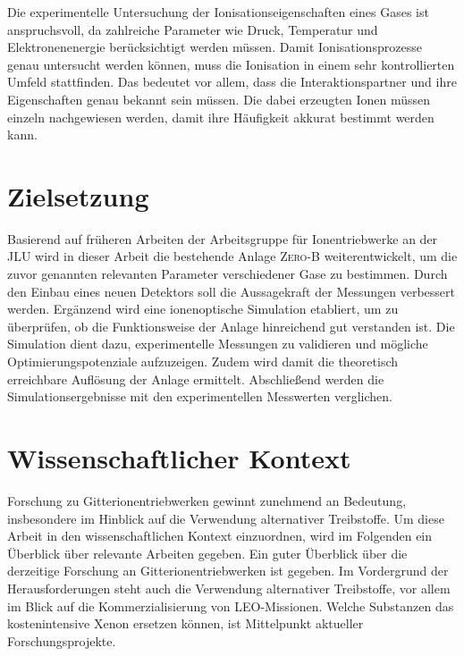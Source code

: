 Die experimentelle Untersuchung der Ionisationseigenschaften eines Gases ist anspruchsvoll, da zahlreiche Parameter wie Druck, Temperatur und Elektronenenergie berücksichtigt werden müssen. Damit Ionisationsprozesse genau untersucht werden können, muss die Ionisation in einem sehr kontrollierten Umfeld stattfinden. Das bedeutet vor allem, dass die Interaktionspartner und ihre Eigenschaften genau bekannt sein müssen. Die dabei erzeugten Ionen müssen einzeln nachgewiesen werden, damit ihre Häufigkeit akkurat bestimmt werden kann. 

\section{Zielsetzung}
Basierend auf früheren Arbeiten der Arbeitsgruppe für Ionentriebwerke an der JLU wird in dieser Arbeit die bestehende Anlage \textsc{Zero-B} weiterentwickelt, um die zuvor genannten relevanten Parameter verschiedener Gase zu bestimmen. Durch den Einbau eines neuen Detektors soll die Aussagekraft der Messungen verbessert werden. Ergänzend wird eine ionenoptische Simulation etabliert, um zu überprüfen, ob die Funktionsweise der Anlage hinreichend gut verstanden ist. Die Simulation dient dazu, experimentelle Messungen zu validieren und mögliche Optimierungspotenziale aufzuzeigen. Zudem wird damit die theoretisch erreichbare Auflösung der Anlage ermittelt. Abschließend werden die Simulationsergebnisse mit den experimentellen Messwerten verglichen.

\section{Wissenschaftlicher Kontext}
Forschung zu Gitterionentriebwerken gewinnt zunehmend an Bedeutung, insbesondere im Hinblick auf die Verwendung alternativer Treibstoffe. Um diese Arbeit in den wissenschaftlichen Kontext einzuordnen, wird im Folgenden ein Überblick über relevante Arbeiten gegeben. Ein guter Überblick über die derzeitige Forschung an Gitterionentriebwerken ist \cite{ion} gegeben. Im Vordergrund der Herausforderungen steht auch die Verwendung alternativer Treibstoffe, vor allem im Blick auf die Kommerzialisierung von LEO-Missionen. Welche Substanzen das kostenintensive Xenon ersetzen können, ist Mittelpunkt aktueller Forschungsprojekte.
 
